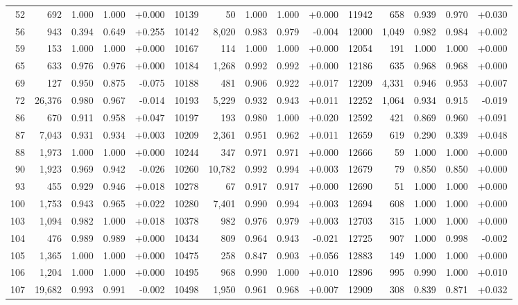 \begin{longtable}{@{}rrrrr@{\hspace{1.5em}}rrrrr@{\hspace{1.5em}}rrrrr@{}}
52 & 692 & 1.000 & 1.000 & +0.000 & 10139 & 50 & 1.000 & 1.000 & +0.000 & 11942 & 658 & 0.939 & 0.970 & +0.030\\
56 & 943 & 0.394 & 0.649 & +0.255 & 10142 & 8,020 & 0.983 & 0.979 & -0.004 & 12000 & 1,049 & 0.982 & 0.984 & +0.002\\
59 & 153 & 1.000 & 1.000 & +0.000 & 10167 & 114 & 1.000 & 1.000 & +0.000 & 12054 & 191 & 1.000 & 1.000 & +0.000\\
65 & 633 & 0.976 & 0.976 & +0.000 & 10184 & 1,268 & 0.992 & 0.992 & +0.000 & 12186 & 635 & 0.968 & 0.968 & +0.000\\
69 & 127 & 0.950 & 0.875 & -0.075 & 10188 & 481 & 0.906 & 0.922 & +0.017 & 12209 & 4,331 & 0.946 & 0.953 & +0.007\\
72 & 26,376 & 0.980 & 0.967 & -0.014 & 10193 & 5,229 & 0.932 & 0.943 & +0.011 & 12252 & 1,064 & 0.934 & 0.915 & -0.019\\
86 & 670 & 0.911 & 0.958 & +0.047 & 10197 & 193 & 0.980 & 1.000 & +0.020 & 12592 & 421 & 0.869 & 0.960 & +0.091\\
87 & 7,043 & 0.931 & 0.934 & +0.003 & 10209 & 2,361 & 0.951 & 0.962 & +0.011 & 12659 & 619 & 0.290 & 0.339 & +0.048\\
88 & 1,973 & 1.000 & 1.000 & +0.000 & 10244 & 347 & 0.971 & 0.971 & +0.000 & 12666 & 59 & 1.000 & 1.000 & +0.000\\
90 & 1,923 & 0.969 & 0.942 & -0.026 & 10260 & 10,782 & 0.992 & 0.994 & +0.003 & 12679 & 79 & 0.850 & 0.850 & +0.000\\
93 & 455 & 0.929 & 0.946 & +0.018 & 10278 & 67 & 0.917 & 0.917 & +0.000 & 12690 & 51 & 1.000 & 1.000 & +0.000\\
100 & 1,753 & 0.943 & 0.965 & +0.022 & 10280 & 7,401 & 0.990 & 0.994 & +0.003 & 12694 & 608 & 1.000 & 1.000 & +0.000\\
103 & 1,094 & 0.982 & 1.000 & +0.018 & 10378 & 982 & 0.976 & 0.979 & +0.003 & 12703 & 315 & 1.000 & 1.000 & +0.000\\
104 & 476 & 0.989 & 0.989 & +0.000 & 10434 & 809 & 0.964 & 0.943 & -0.021 & 12725 & 907 & 1.000 & 0.998 & -0.002\\
105 & 1,365 & 1.000 & 1.000 & +0.000 & 10475 & 258 & 0.847 & 0.903 & +0.056 & 12883 & 149 & 1.000 & 1.000 & +0.000\\
106 & 1,204 & 1.000 & 1.000 & +0.000 & 10495 & 968 & 0.990 & 1.000 & +0.010 & 12896 & 995 & 0.990 & 1.000 & +0.010\\
107 & 19,682 & 0.993 & 0.991 & -0.002 & 10498 & 1,950 & 0.961 & 0.968 & +0.007 & 12909 & 308 & 0.839 & 0.871 & +0.032\\

\end{longtable}
